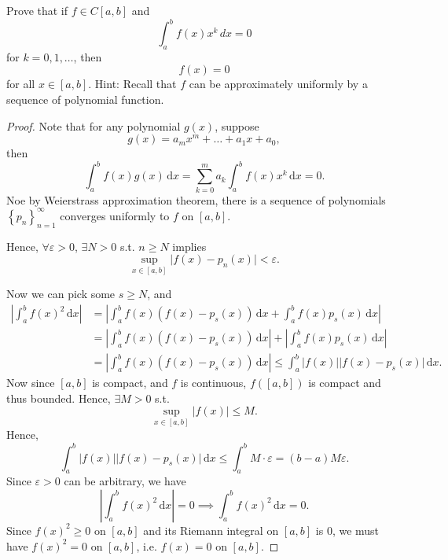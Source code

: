 \begin{problem}

    Prove that if \(f\in C[a,b]\) and
    \[
    \int_a^b f(x)x^k\,dx=0
    \]
    for \(k=0,1,\ldots\), then
    \[
    f(x)=0
    \]
    for all \(x\in[a,b]\).
    Hint: Recall that $f$ can be approximately uniformly by a sequence of polynomial function.
        
\end{problem}
\begin{proof}
    Note that for any polynomial \(g(x)\), suppose 
    \[
        g(x) = a_m x^m + \dots + a_1 x + a_0, 
    \] 
    then 
    \[
        \int _a^b f(x) g(x) \, \mathrm{d} x = \sum_{k=0}^m a_k \int _a^b f(x) x^k \, \mathrm{d} x = 0.   
    \]
    Noe by Weierstrass approximation theorem, there is a sequence of polynomials \(\left\{ p_n \right\}_{n=1}^{\infty} \) converges uniformly to \(f\) on \([a, b]\). 

    Hence, \(\forall \varepsilon > 0\), \(\exists N > 0\) s.t. \(n \ge N\) implies 
    \[
        \sup _{x \in [a, b]} \vert f(x) - p_n(x) \vert < \varepsilon. 
    \]   

    Now we can pick some \(s \ge N\), and 
    \begin{align*}
        \left\vert \int _a^b f(x)^2 \, \mathrm{d} x  \right\vert &= \left\vert \int _a^b f(x) \left( f(x) - p_s(x) \right) \, \mathrm{d} x + \int _a^b f(x) p_s(x) \, \mathrm{d} x    \right\vert \\
        &= \left\vert \int _a^b f(x) \left( f(x) - p_s(x) \right) \, \mathrm{d} x \right\vert + \left\vert \int _a^b f(x) p_s(x) \, \mathrm{d} x \right\vert \\
        &= \left\vert \int _a^b f(x) (f(x) - p_s(x)) \, \mathrm{d} x \right\vert \le \int _a^b \left\vert f(x) \right\vert \vert f(x) - p_s(x) \vert  \, \mathrm{d} x.  
    \end{align*} 
    Now since \([a, b]\) is compact, and \(f\) is continuous, \(f([a, b])\) is compact and thus bounded. Hence, \(\exists M > 0\) s.t.
    \[
        \sup _{x \in [a, b]} \vert f(x) \vert \le M.
    \]   
    Hence,
    \[
        \int _a^b \left\vert f(x) \right\vert \vert f(x) - p_s(x) \vert  \, \mathrm{d} x \le \int _a^b M \cdot \varepsilon = (b - a) M \varepsilon.
    \]
    Since \(\varepsilon > 0\) can be arbitrary, we have 
    \[
        \left\vert \int _a^b f(x)^2 \, \mathrm{d} x  \right\vert = 0 \implies \int _a^b f(x)^2 \, \mathrm{d} x = 0. 
    \] 
    Since \(f(x)^2 \ge 0\) on \([a, b]\) and its Riemann integral on \([a, b]\) is \(0\), we must have \(f(x)^2 = 0\) on \([a, b]\), i.e. \(f(x) = 0\) on \([a, b]\).      
\end{proof}
    
